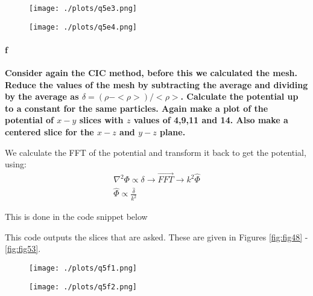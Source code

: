 \begin{figure}[ht]\centering
\begin{minipage}[t]{.5\textwidth}
\centering
\texttt{[image: ./plots/q5e3.png]}
\captionsetup{width=0.8\linewidth}
\label{fig:fig46}
\end{minipage}%
\begin{minipage}[t]{.5\textwidth}
\centering
\texttt{[image: ./plots/q5e4.png]}
\captionsetup{width=0.8\linewidth}
\label{fig:fig47}
\end{minipage}%
\end{figure}

\clearpage
\paragraph{f} \textbf{Consider again the CIC method, before this we calculated the mesh. Reduce the values of the mesh by subtracting the average and dividing by the average as $\delta = (\rho - <\rho>)/<\rho>$. Calculate the potential up to a constant for the same particles. Again make a plot of the potential of $x-y$ slices with $z$ values of 4,9,11 and 14. Also make a centered slice for the $x-z$ and $y-z$ plane.}

We calculate the FFT of the potential and transform it back to get the potential, using:
\begin{equation}
\begin{split}
\nabla^2 \Phi \propto \delta \rightarrow \overrightarrow{FFT} \rightarrow k^2 \hat{\Phi} \\
\hat{\Phi} \propto \frac{\hat{\delta}}{k^2}
\end{split}
\end{equation}

This is done in the code snippet below






This code outputs the slices that are asked. These are given in Figures \ref{fig:fig48} - \ref{fig:fig53}. 

\begin{figure}[ht]\centering
\begin{minipage}[t]{.5\textwidth}
\centering
\texttt{[image: ./plots/q5f1.png]}
\captionsetup{width=0.8\linewidth}
\label{fig:fig48}
\end{minipage}%
\begin{minipage}[t]{.5\textwidth}
\centering
\texttt{[image: ./plots/q5f2.png]}
\captionsetup{width=0.8\linewidth}
\label{fig:fig49}
\end{minipage}%
\end{figure}

